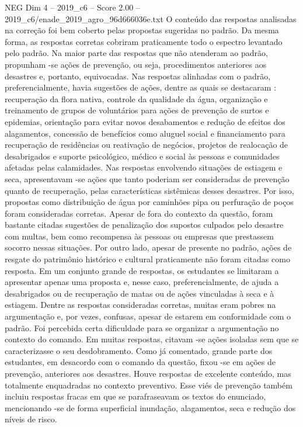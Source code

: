 \begin{textsample}{NEG Dim 4 – 2019\_c6 – Score 2.00 – 2019\_c6/enade\_2019\_agro\_96d666036e.txt}
O conteúdo das respostas analisadas na correção foi bem coberto pelas propostas sugeridas no padrão.
Da mesma forma, as respostas corretas cobriram praticamente todo o espectro levantado pelo padrão.
Na maior parte das respostas que não atenderam ao padrão, propunham -se ações de prevenção, ou seja, procedimentos anteriores aos desastres e, portanto, equivocadas.
Nas respostas alinhadas com o padrão, preferencialmente, havia sugestões de ações, dentre as quais se destacaram : recuperação da flora nativa, controle da qualidade da água, organização e treinamento de grupos de voluntários para ações de prevenção de surtos e epidemias, orientação para evitar novos desabamentos e redução de efeitos dos alagamentos, concessão de benefícios como aluguel social e financiamento para recuperação de residências ou reativação de negócios, projetos de realocação de desabrigados e suporte psicológico, médico e social às pessoas e comunidades afetadas pelas calamidades.
Nas respostas envolvendo situações de estiagem e seca, apresentavam -se ações que tanto poderiam ser consideradas de prevenção quanto de recuperação, pelas características sistêmicas desses desastres.
Por isso, propostas como distribuição de água por caminhões pipa ou perfuração de poços foram consideradas corretas.
Apesar de fora do contexto da questão, foram bastante citadas sugestões de penalização dos supostos culpados pelo desastre com multas, bem como recompensa às pessoas ou empresas que prestassem socorro nessas situações.
Por outro lado, apesar de presente no padrão, ações de resgate do patrimônio histórico e cultural praticamente não foram citadas como resposta.
Em um conjunto grande de respostas, os estudantes se limitaram a apresentar apenas uma proposta e, nesse caso, preferencialmente, de ajuda a desabrigados ou de recuperação de matas ou de ações vinculadas à seca e à estiagem.
Dentre as respostas consideradas corretas, muitas eram pobres na argumentação e, por vezes, confusas, apesar de estarem em conformidade com o padrão.
Foi percebida certa dificuldade para se organizar a argumentação no contexto do comando.
Em muitas respostas, citavam -se ações isoladas sem que se caracterizasse o seu desdobramento.
Como já comentado, grande parte dos estudantes, em desacordo com o comando da questão, fixou -se em ações de prevenção, anteriores aos desastres.
Houve respostas de excelente conteúdo, mas totalmente enquadradas no contexto preventivo.
Esse viés de prevenção também incluiu respostas fracas em que se parafraseavam os textos do enunciado, mencionando -se de forma superficial inundação, alagamentos, seca e redução dos níveis de risco.

\end{textsample}
